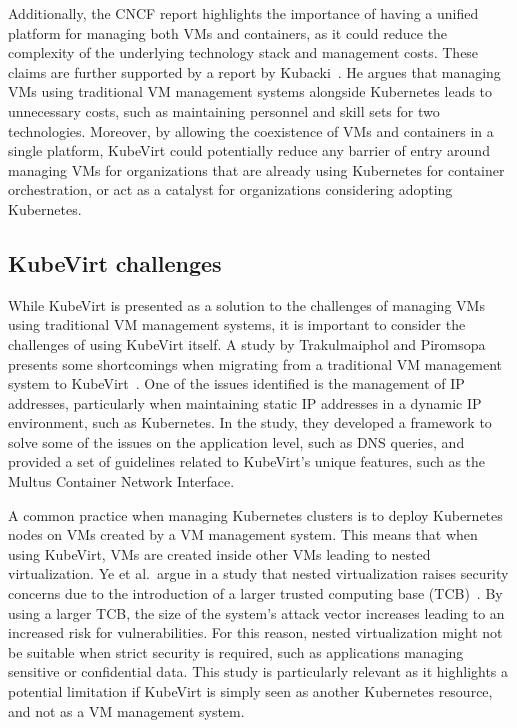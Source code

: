 \documentclass{article}
\begin{document}
Additionally, the CNCF report highlights the importance of having a unified platform for managing both VMs and containers, as it could reduce the complexity of the underlying technology stack and management costs. These claims are further supported by a report by Kubacki\ \cite{kubevirt-storware}. He argues that managing VMs using traditional VM management systems alongside Kubernetes leads to unnecessary costs, such as maintaining personnel and skill sets for two technologies. Moreover, by allowing the coexistence of VMs and containers in a single platform, KubeVirt could potentially reduce any barrier of entry around managing VMs for organizations that are already using Kubernetes for container orchestration, or act as a catalyst for organizations considering adopting Kubernetes. 

\subsection{KubeVirt challenges}
While KubeVirt is presented as a solution to the challenges of managing VMs using traditional VM management systems, it is important to consider the challenges of using KubeVirt itself. A study by Trakulmaiphol and Piromsopa presents some shortcomings when migrating from a traditional VM management system to KubeVirt\ \cite{kubevirt-migrate-issues}. One of the issues identified is the management of IP addresses, particularly when maintaining static IP addresses in a dynamic IP environment, such as Kubernetes. In the study, they developed a framework to solve some of the issues on the application level, such as DNS queries, and provided a set of guidelines related to KubeVirt's unique features, such as the Multus Container Network Interface. 

A common practice when managing Kubernetes clusters is to deploy Kubernetes nodes on VMs created by a VM management system. This means that when using KubeVirt, VMs are created inside other VMs leading to nested virtualization. Ye et al.\ argue in a study that nested virtualization raises security concerns due to the introduction of a larger trusted computing base (TCB)\ \cite{free-turtles}. By using a larger TCB, the size of the system's attack vector increases leading to an increased risk for vulnerabilities. For this reason, nested virtualization might not be suitable when strict security is required, such as applications managing sensitive or confidential data. This study is particularly relevant as it highlights a potential limitation if KubeVirt is simply seen as another Kubernetes resource, and not as a VM management system. 
\end{document}
